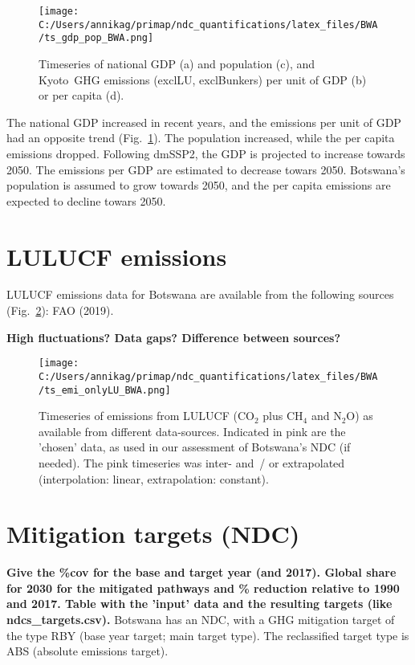 \documentclass[12pt]{article}
\begin{document}
 \begin{figure}[H]
 \centering
 \texttt{[image: C:/Users/annikag/primap/ndc\_quantifications/latex\_files/BWA/ts\_gdp\_pop\_BWA.png]}
 \caption{Timeseries of national GDP (a) and population (c), and Kyoto~GHG emissions (exclLU, exclBunkers) per unit of GDP (b) or per capita (d).}
 \label{fig:tsSocioEco}
 \end{figure}

 The national GDP increased in recent years, and the emissions per unit of GDP had an opposite trend (Fig.~\ref{fig:tsSocioEco}).
 The population increased, while the per capita emissions dropped. 
 Following dmSSP2, the GDP is projected to increase towards 2050. 
 The emissions per GDP are estimated to decrease towars 2050. 
 Botswana's population is assumed to grow towards 2050, and the per capita emissions are expected to decline towars 2050. 

 \newpage %
 \section{LULUCF emissions}
 \label{sec:emiLULUCF}
 LULUCF emissions data for Botswana are available from the following sources (Fig.~\ref{fig:tsLULUCF}): FAO (2019).

 \textbf{High fluctuations? Data gaps? Difference between sources?}

 \begin{figure}[H]
 \centering
 \texttt{[image: C:/Users/annikag/primap/ndc\_quantifications/latex\_files/BWA/ts\_emi\_onlyLU\_BWA.png]}
 \caption{Timeseries of emissions from LULUCF (CO$_2$ plus CH$_4$ and N$_2$O) as available from different data-sources. 
 Indicated in pink are the 'chosen' data, as used in our assessment of Botswana's NDC (if needed). 
 The pink timeseries was inter- and~/ or extrapolated (interpolation: linear, extrapolation: constant).}
 \label{fig:tsLULUCF}
 \end{figure}

 \newpage %
 \section{Mitigation targets (NDC)}
 \label{sec:mitiTars}

 \textbf{ 
 Give the \%cov for the base and target year (and 2017).
 Global share for 2030 for the mitigated pathways and \% reduction relative to 1990 and 2017.
 Table with the 'input' data and the resulting targets (like ndcs\_targets.csv).}
 Botswana has an NDC, with a GHG mitigation target of the type RBY (base year target; main target type).
 The reclassified target type is ABS (absolute emissions target).
\end{document}
